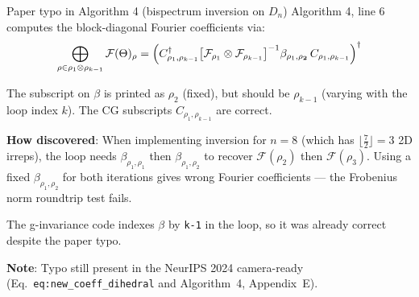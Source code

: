 \documentclass[aspectratio=169]{beamer}
\begin{document}
\begin{frame}{Paper typo in Algorithm 4 (bispectrum inversion on $D_n$)}
  Algorithm 4, line 6 computes the block-diagonal Fourier coefficients via:
  \[
    \bigoplus_{\rho \in \rho_1 \otimes \rho_{k-1}} \mathcal{F}(\Theta)_\rho
    = \Bigl(
      C_{\rho_1,\rho_{k-1}}^\dagger
      \bigl[\mathcal{F}_{\rho_1} \otimes \mathcal{F}_{\rho_{k-1}}\bigr]^{-1}
      \beta_{\rho_1,\rho_{\mathbf{2}}}
      \, C_{\rho_1,\rho_{k-1}}
    \Bigr)^\dagger
  \]

  The subscript on $\beta$ is printed as $\rho_2$ (fixed), but should be
  $\rho_{k-1}$ (varying with the loop index $k$). The CG subscripts
  $C_{\rho_1,\rho_{k-1}}$ are correct.

  \bigskip

  \textbf{How discovered}: When implementing inversion for $n=8$ (which has
  $\lfloor\frac{7}{2}\rfloor = 3$ 2D irreps), the loop needs
  $\beta_{\rho_1,\rho_1}$ then $\beta_{\rho_1,\rho_2}$ to recover
  $\mathcal{F}(\rho_2)$ then $\mathcal{F}(\rho_3)$.
  Using a fixed $\beta_{\rho_1,\rho_2}$ for both iterations gives wrong
  Fourier coefficients --- the Frobenius norm roundtrip test fails.

  \bigskip

  The g-invariance code indexes $\beta$ by \texttt{k-1} in the loop, so it
  was already correct despite the paper typo.

  \smallskip

  \textbf{Note}: Typo still present in the NeurIPS 2024 camera-ready
  (Eq.~\texttt{eq:new\_coeff\_dihedral} and Algorithm~4, Appendix~E).
\end{frame}
\end{document}
